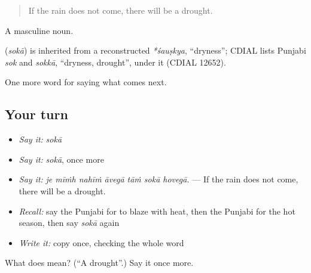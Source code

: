 \begin{quote}
If the rain does not come, there will be a drought.
\end{quote}

A masculine noun.

\begin{cousinweb}
\textbf{} (\emph{sokā}) is inherited from a reconstructed \emph{*śauṣkya}, \textquotedblleft{}dryness\textquotedblright{}; CDIAL lists Punjabi \emph{sok} and \emph{sokkā}, \textquotedblleft{}dryness, drought\textquotedblright{}, under it (CDIAL 12652).
\end{cousinweb}

\begin{grammarlens}[title={What you've built}]
One more word for saying what comes next.
\end{grammarlens}

\subsection*{Your turn}
\begin{itemize}
\raggedright
  \item \emph{Say it:} \emph{sokā}
  \item \emph{Say it:} \emph{sokā}, once more
  \item \emph{Say it:} \emph{je mīṁh nahīṁ āvegā tāṁ sokā hovegā.} — If the rain does not come, there will be a drought.
  \item \emph{Recall:} say the Punjabi for to blaze with heat, then the Punjabi for the hot season, then say \emph{sokā} again
  \item \emph{Write it:} copy \textbf{} once, checking the whole word
\end{itemize}

\begin{tcolorbox}[breakable,colback=teal!4,colframe=teal!35!black,title={Before you move on}]
What does  mean? (\textquotedblleft{}A drought\textquotedblright{}.) Say it once more.
\end{tcolorbox}
